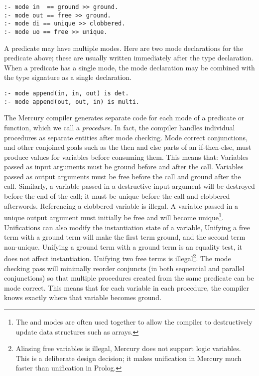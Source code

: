 \begin{verbatim}
:- mode in  == ground >> ground.
:- mode out == free >> ground.
:- mode di == unique >> clobbered.
:- mode uo == free >> unique.
\end{verbatim}

\noindent
A predicate may have multiple modes.
Here are two mode declarations for the  predicate above;
these are usually written immediately after the type declaration.
When a predicate has a single mode,
the mode declaration may be combined with the type signature as a single
declaration.

\begin{verbatim}
:- mode append(in, in, out) is det.
:- mode append(out, out, in) is multi.
\end{verbatim}

\noindent
The Mercury compiler generates separate code
for each mode of a predicate or function,
which we call a \emph{procedure}.
In fact, the compiler handles individual procedures as separate entities
after mode checking.
Mode correct conjunctions,
and other conjoined goals such as the then and else parts of an if-then-else,
must produce values for variables before consuming them.
This means that:
Variables passed as input arguments must be ground before and after the
call.
Variables passed as output arguments must be free before the call and
ground after the call.
Similarly, a variable passed in a destructive input argument will be destroyed
before the end of the call;
it must be unique before the call and clobbered afterwords.
Referencing a clobbered variable is illegal.
A variable passed in a unique output argument must initially be free and
will become unique\footnote{
    The \di and \uo modes are often used together to allow the compiler to
    destructively update data structures such as arrays.}.
Unifications can also modify the instantiation state of a variable,
Unifying a free term with a ground term will make the first term ground,
and the second term non-unique.
Unifying a ground term with a ground term is an equality test,
it does not affect instantiation.
Unifying two free terms is illegal\footnote{
Aliasing free variables is illegal,
Mercury does not support logic variables.
This is a deliberate design decision;
it makes unification in Mercury much
faster than unification in Prolog.}.
The mode checking pass will minimally reorder conjuncts 
(in both sequential and parallel conjunctions)
so that multiple procedures created from the same predicate can be mode
correct.
This means that for each variable in each procedure,
the compiler knows exactly where that variable becomes ground.

